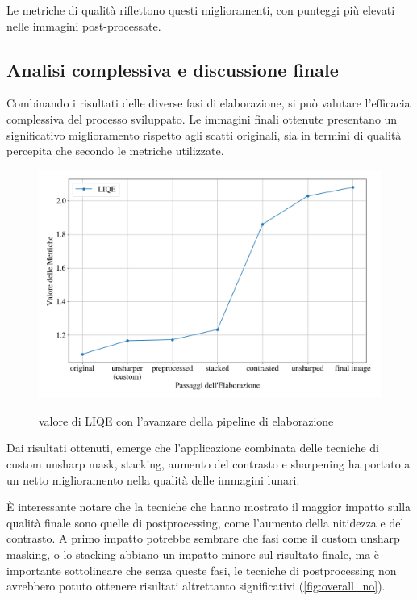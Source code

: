 Le metriche di qualità riflettono questi miglioramenti, con punteggi più elevati nelle immagini post-processate.

\subsection{Analisi complessiva e discussione finale}

Combinando i risultati delle diverse fasi di elaborazione, si può valutare l'efficacia complessiva del processo sviluppato. Le immagini finali ottenute presentano un significativo miglioramento rispetto agli scatti originali, sia in termini di qualità percepita che secondo le metriche utilizzate.

\begin{figure}[H]
    \centering
    \caption{valore di LIQE con l'avanzare della pipeline di elaborazione}
    \includegraphics[width=\linewidth]{../assets/overall.png}
    \label{fig:overall}
\end{figure}

Dai risultati ottenuti, emerge che l'applicazione combinata delle tecniche di custom unsharp mask, stacking, aumento del contrasto e sharpening ha portato a un netto miglioramento nella qualità delle immagini lunari. 

È interessante notare che la tecniche che hanno mostrato il maggior impatto sulla qualità finale sono quelle di postprocessing, come l'aumento della nitidezza e del contrasto. A primo impatto potrebbe sembrare che fasi come il custom unsharp masking, o lo stacking abbiano un impatto minore sul risultato finale, ma è importante sottolineare che senza queste fasi, le tecniche di postprocessing non avrebbero potuto ottenere risultati altrettanto significativi (\cref{fig:overall_no}).

